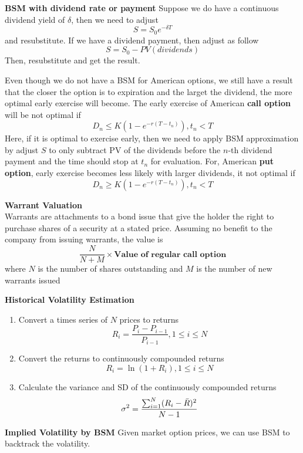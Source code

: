 \documentclass[11pt,fleqn]{book} %
\numberwithin{equation}{section} %
\numberwithin{figure}{section} %
\numberwithin{table}{section} %
\begin{document}
 \begin{theorem}\textbf{BSM with dividend rate or payment}
 Suppose we do have a continuous dividend yield of $\delta$, then we need to adjust
 $$
 S=S_0e^{-\delta T}
 $$
 and resubstitute. If we have a dividend payment, then adjust as follow
 $$
 S=S_0-PV(dividends)
 $$
 Then, resubstitute and get the result.
 \end{theorem}
 \begin{remark}
 Even though we do not have a BSM for American options, we still have a result that the closer the option is to expiration and the larget the dividend, the more optimal early exercise will become. The early exercise of American \textbf{call option }will be not optimal if
 $$
 D_n\leq K(1-e^{-r(T-t_n)}),t_n<T
 $$
 Here, if it is optimal to exercise early, then we need to apply BSM approximation by adjust $S$ to only subtract PV of the dividends before the $n$-th dividend payment and the time should stop at $t_n$ for evaluation. For, American \textbf{put option}, early exercise becomes less likely with larger dividends, it not optimal if
 $$
 D_n\geq K(1-e^{-r(T-t_n)}),t_n<T
 $$
 \end{remark}
 \begin{theorem}\textbf{Warrant Valuation}\\
 Warrants are attachments to a bond issue that give the holder the right to purchase shares of a security at a stated price. Assuming no benefit to the company from issuing warrants, the value is
 $$
 \frac{N}{N+M}\times\textbf{Value of regular call option}
 $$
 where $N$ is the number of shares outstanding and $M$ is the number of new warrants issued
 \end{theorem}
 \begin{definition}\textbf{Historical Volatility Estimation}
 \begin{enumerate}
     \item Convert a times series of $N$ prices to returns
     $$
     R_i=\frac{P_i-P_{i-1}}{P_{i-1}},1\leq i\leq N
     $$
     \item Convert the returns to continuously compounded returns
     $$
     R_i=\ln(1+R_i),1\leq i\leq N
     $$
     \item Calculate the variance and SD of the continuously compounded returns
     $$
     \sigma^2=\frac{\sum_{i=1}^N(R_{i}-\Bar{R})^2}{N-1}
     $$
 \end{enumerate}
 \end{definition}
 \begin{theorem}\textbf{Implied Volatility by BSM}
 Given market option prices, we can use BSM to backtrack the volatility.
 \end{theorem}
\end{document}
